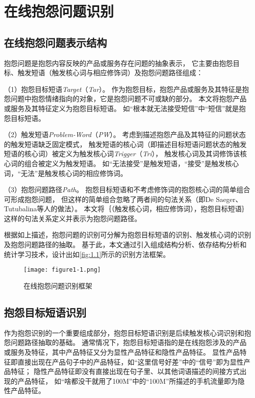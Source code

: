 \section{在线抱怨问题识别}\label{sec:1.3}
\subsection{在线抱怨问题表示结构}\label{subsection:1.3.1}

抱怨问题是抱怨内容反映的产品或服务存在问题的抽象表示，
它主要由抱怨目标、触发短语（触发核心词与相应修饰词）及抱怨问题路径组成：

（1）抱怨目标短语{\itshape Target\/}（{\itshape Tar\/}）。
作为抱怨目标，抱怨产品或服务及其特征是抱怨问题中抱怨情绪指向的对象，它是抱怨问题不可或缺的部分。
本文将抱怨产品或服务及其特征定义为抱怨目标短语。
如“根本就无法接受短信”中“短信”就是抱怨目标短语。

（2）触发短语{\itshape Problem-Word\/}（{\itshape PW\/}）。
考虑到描述抱怨产品及其特征的问题状态的触发短语缺乏固定模式，
触发短语的核心词（即描述目标短语问题状态的触发短语的核心词）被定义为触发核心词\textit{Trigger}（\textit{Tri}），
触发核心词及其词修饰该核心词的组合被定义为触发短语。
如“无法接受”是触发短语，“接受”是触发核心词，“无法”是触发核心词的相应修饰词。

（3）抱怨问题路径{\itshape Path\/}。
抱怨目标短语和不考虑修饰词的抱怨核心词的简单组合可形成抱怨问题，
但这样的简单组合忽略了两者间的句法关系（即De Saeger、Tutubalina等人的做法）。
本文将｛（触发核心词，相应修饰词），抱怨目标短语｝这样的句法关系定义并表示为抱怨问题路径。

根据如上描述，抱怨问题的识别可分解为抱怨目标短语的识别、触发核心词的识别及抱怨问题路径的抽取。
基于此，本文通过引入组成结构分析、依存结构分析和统计学习技术，设计出如\autoref{fig:1.1}所示的识别方法框架。

\begin{figure}[th]

\centering
\texttt{[image: figure1-1.png]}
\vskip -20pt
\caption{在线抱怨问题识别框架}\label{fig:1.1}

\end{figure}

\subsection{抱怨目标短语识别}\label{subsection:1.3.2}

作为抱怨识别的一个重要组成部分，抱怨目标短语识别是后续触发核心词识别和抱怨问题路径抽取的基础。
通常情况下，抱怨目标短语指的是在线抱怨涉及的产品或服务及特征，其中产品特征又分为显性产品特征和隐性产品特征。
显性产品特征即直接出现在产品句子中的产品特征，如“这里信号好差”中的“信号”即为显性产品特征；
隐性产品特征即没有直接出现在句子里、以其他词语描述的间接方式出现的产品特征，
如“啥都没干就用了100M”中的“100M”所描述的手机流量即为隐性产品特征。


